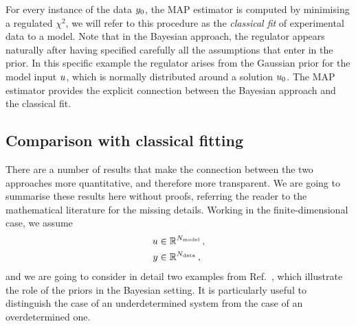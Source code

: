 For every instance of the data $y_0$, the MAP estimator is computed by
minimising a regulated $\chi^2$, we will refer to this procedure as the {\em
classical fit} of experimental data to a model. Note that in the Bayesian
approach, the regulator appears naturally after having specified carefully all
the assumptions that enter in the prior. In this specific example the regulator
arises from the Gaussian prior for the model input $u$, which is
normally distributed around a solution $u_0$. The MAP estimator
provides the explicit connection between the Bayesian approach and the classical
fit.

\subsection{Comparison with classical fitting}
\label{sec:comp-class-fit}

There are a number of results that make the connection between the two
approaches more quantitative, and therefore more transparent. We are going to
summarise these results here without proofs, referring the reader to the
mathematical literature for the missing details. Working in the
finite-dimensional case, we assume 
\begin{align*}
  u &\in \mathbb{R}^{N_{\rm model}} \, ,\\
  y &\in \mathbb{R}^{N_{\rm data}}\, ,
\end{align*}
and we are going to consider in detail two examples from Ref.~\cite{StuartCore},
which illustrate the role of the priors in the Bayesian setting. It is
particularly useful to distinguish the case of an underdetermined system from
the case of an overdetermined one. 

